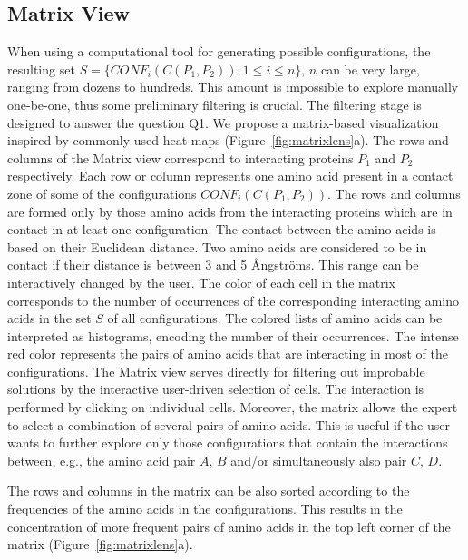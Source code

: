 \documentclass{bmcart}
\def\MatView {Matrix view\xspace}
\begin{document}

\subsection*{Matrix View}
\label{sec:matview}
When using a computational tool for generating possible configurations, the resulting set $S = \{CONF_i(C(P_1,P_2)); 1 \leq i \leq n\}$, $n$ can be very large, ranging from dozens to hundreds. 
This amount is impossible to explore manually one-be-one, thus some preliminary filtering is crucial.
The filtering stage is designed to answer the question Q1.
We propose a matrix-based visualization inspired by commonly used heat maps (Figure~\ref{fig:matrixlens}a).
The rows and columns of the \MatView correspond to interacting proteins $P_1$ and $P_2$ respectively.
Each row or column represents one amino acid present in a contact zone of some of the configurations $CONF_i(C(P_1,P_2))$. 
The rows and columns are formed only by those amino acids from the interacting proteins which are in contact in at least one configuration.
The contact between the amino acids is based on their Euclidean distance. 
Two amino acids are considered to be in contact if their distance is between 3 and 5 \AA ngstr\"{o}ms.
This range can be interactively changed by the user.
The color of each cell in the matrix corresponds to the number of occurrences of the corresponding interacting amino acids in the set $S$ of all configurations. 
The colored lists of amino acids can be interpreted as histograms, encoding the number of their occurrences.
The intense red color represents the pairs of amino acids that are interacting in most of the configurations.
The \MatView serves directly for filtering out improbable solutions by the interactive user-driven selection of cells.
The interaction is performed by clicking on individual cells. 
Moreover, the matrix allows the expert to select a combination of several pairs of amino acids.
This is useful if the user wants to further explore only those configurations that contain the interactions between, e.g., the amino acid pair $A$, $B$ and/or simultaneously also pair $C$, $D$. 

The rows and columns in the matrix can be also sorted according to the frequencies of the amino acids in the configurations. 
This results in the concentration of more frequent pairs of amino acids in the top left corner of the matrix (Figure~\ref{fig:matrixlens}a).
\end{document}
